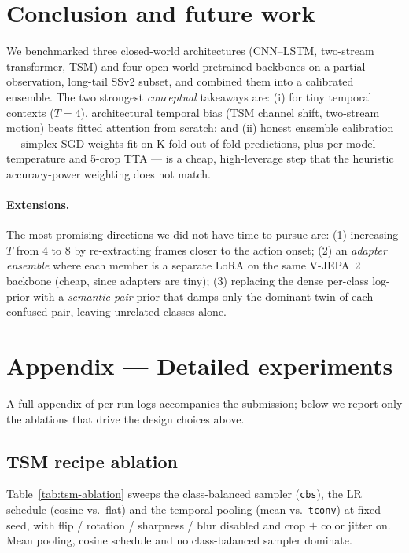\documentclass[10pt,twocolumn,letterpaper]{article}
\begin{document}
\section{Conclusion and future work}

We benchmarked three closed-world architectures (CNN--LSTM, two-stream
transformer, TSM) and four open-world pretrained backbones on a
partial-observation, long-tail SSv2 subset, and combined them into a
calibrated ensemble. The two strongest \emph{conceptual} takeaways are:
(i) for tiny temporal contexts ($T=4$), architectural temporal bias
(TSM channel shift, two-stream motion) beats fitted attention from
scratch; and (ii) honest ensemble calibration --- simplex-SGD weights
fit on K-fold out-of-fold predictions, plus per-model temperature and
5-crop TTA --- is a cheap, high-leverage step that the heuristic
accuracy-power weighting does not match.

\paragraph{Extensions.} The most promising directions we did not have
time to pursue are: (1) increasing $T$ from $4$ to $8$ by re-extracting
frames closer to the action onset; (2) an \emph{adapter ensemble} where
each member is a separate LoRA on the same V-JEPA~2 backbone (cheap,
since adapters are tiny); (3) replacing the dense per-class log-prior
with a \emph{semantic-pair} prior that damps only the dominant twin of
each confused pair, leaving unrelated classes alone.

\appendix
\section{Appendix --- Detailed experiments}

A full appendix of per-run logs accompanies the submission; below we
report only the ablations that drive the design choices above.

\subsection{TSM recipe ablation}

Table~\ref{tab:tsm-ablation} sweeps the class-balanced sampler
(\texttt{cbs}), the LR schedule (cosine vs.~flat) and the temporal
pooling (mean vs.~\texttt{tconv}) at fixed seed, with flip / rotation /
sharpness / blur disabled and crop $+$ color jitter on. Mean pooling,
cosine schedule and no class-balanced sampler dominate.
\end{document}
